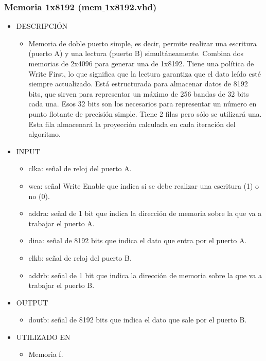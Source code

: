\subsubsection{Memoria 1x8192 (mem$\_$1x8192.vhd)}

\begin{itemize}
    \item DESCRIPCIÓN
        \begin{itemize}
            \item Memoria de doble puerto simple, es decir, permite realizar una escritura (puerto A) y una lectura (puerto B) simultáneamente. Combina dos memorias de 2x4096 para generar una de 1x8192. Tiene una política de Write First, lo que significa que la lectura garantiza que el dato leído esté siempre actualizado. Está estructurada para almacenar datos de 8192 bits, que sirven para representar un máximo de 256 bandas de 32 bits cada una. Esos 32 bits son los necesarios para representar un número en punto flotante de precisión simple. Tiene 2 filas pero sólo se utilizará una. Esta fila almacenará la proyección calculada en cada iteración del algoritmo.
        \end{itemize}
    \item INPUT
        \begin{itemize}
            \item clka: señal de reloj del puerto A.
            \item wea: señal Write Enable que indica si se debe realizar una escritura (1) o no (0).
            \item addra: señal de 1 bit que indica la dirección de memoria sobre la que va a trabajar el puerto A.
            \item dina: señal de 8192 bits que indica el dato que entra por el puerto A.
            \item clkb: señal de reloj del puerto B.
            \item addrb: señal de 1 bit que indica la dirección de memoria sobre la que va a trabajar el puerto B.
        \end{itemize}
    \item OUTPUT
        \begin{itemize}
            \item doutb: señal de 8192 bits que indica el dato que sale por el puerto B.
        \end{itemize}
    \item UTILIZADO EN
        \begin{itemize}
            \item Memoria f.
        \end{itemize}
\end{itemize}

